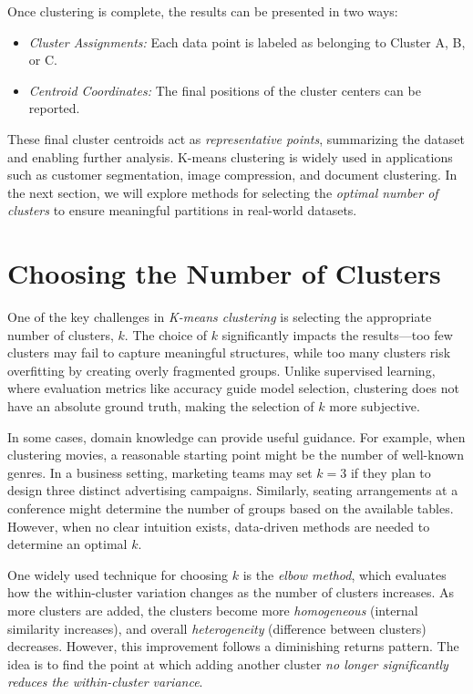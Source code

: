 \documentclass[
  11pt,
]{book}
\providecommand{\tightlist}{%
  \setlength{\itemsep}{0pt}\setlength{\parskip}{0pt}}
\theoremstyle{definition}
\theoremstyle{definition}
\theoremstyle{definition}
\theoremstyle{definition}
\theoremstyle{remark}
\begin{document}
Once clustering is complete, the results can be presented in two ways:

\begin{itemize}
\tightlist
\item
  \emph{Cluster Assignments:} Each data point is labeled as belonging to Cluster A, B, or C.\\
\item
  \emph{Centroid Coordinates:} The final positions of the cluster centers can be reported.
\end{itemize}

These final cluster centroids act as \emph{representative points}, summarizing the dataset and enabling further analysis. K-means clustering is widely used in applications such as customer segmentation, image compression, and document clustering. In the next section, we will explore methods for selecting the \emph{optimal number of clusters} to ensure meaningful partitions in real-world datasets.

\section{Choosing the Number of Clusters}\label{kmeans-choose}

One of the key challenges in \emph{K-means clustering} is selecting the appropriate number of clusters, \emph{\(k\)}. The choice of \(k\) significantly impacts the results---too few clusters may fail to capture meaningful structures, while too many clusters risk overfitting by creating overly fragmented groups. Unlike supervised learning, where evaluation metrics like accuracy guide model selection, clustering does not have an absolute ground truth, making the selection of \(k\) more subjective.

In some cases, domain knowledge can provide useful guidance. For example, when clustering movies, a reasonable starting point might be the number of well-known genres. In a business setting, marketing teams may set \(k = 3\) if they plan to design three distinct advertising campaigns. Similarly, seating arrangements at a conference might determine the number of groups based on the available tables. However, when no clear intuition exists, data-driven methods are needed to determine an optimal \(k\).

One widely used technique for choosing \(k\) is the \emph{elbow method}, which evaluates how the within-cluster variation changes as the number of clusters increases. As more clusters are added, the clusters become more \emph{homogeneous} (internal similarity increases), and overall \emph{heterogeneity} (difference between clusters) decreases. However, this improvement follows a diminishing returns pattern. The idea is to find the point at which adding another cluster \emph{no longer significantly reduces the within-cluster variance}.
\end{document}
